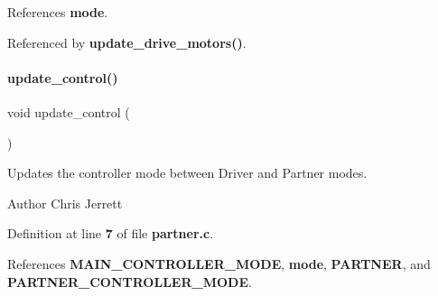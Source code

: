 References \textbf{ mode}.



Referenced by \textbf{ update\+\_\+drive\+\_\+motors()}.

\mbox{\label{partner_8h_ab2c78903a76d2ed8969271803c78368a}} 
\paragraph{update\+\_\+control()}
{\footnotesize\ttfamily void update\+\_\+control (\begin{DoxyParamCaption}{ }\end{DoxyParamCaption})}



Updates the controller mode between Driver and Partner modes. 

\begin{DoxyAuthor}{Author}
Chris Jerrett 
\end{DoxyAuthor}


Definition at line \textbf{ 7} of file \textbf{ partner.\+c}.



References \textbf{ M\+A\+I\+N\+\_\+\+C\+O\+N\+T\+R\+O\+L\+L\+E\+R\+\_\+\+M\+O\+DE}, \textbf{ mode}, \textbf{ P\+A\+R\+T\+N\+ER}, and \textbf{ P\+A\+R\+T\+N\+E\+R\+\_\+\+C\+O\+N\+T\+R\+O\+L\+L\+E\+R\+\_\+\+M\+O\+DE}.

